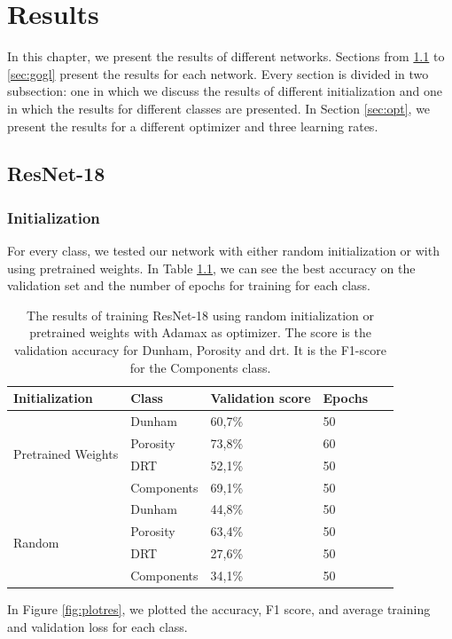\chapter{Results}\label{chp:results}

In this chapter, we present the results of different networks. Sections from \ref{sec:res} to \ref{sec:gogl} present the results for each network. Every section is divided in two subsection: one in which we discuss the results of different initialization and one in which the results for different classes are presented. In Section \ref{sec:opt}, we present the results for a different optimizer and three learning rates. 
\section{ResNet-18}\label{sec:res}
\subsection{Initialization}
For every class, we tested our network with either random initialization or with using pretrained weights. In Table \ref{tab:resinit}, we can see the best accuracy on the validation set and the number of epochs for training for each class.  

\begin{table}
\caption[Results according to initialization of ResNet-18]{\label{tab:resinit} The results of training ResNet-18 using random initialization or pretrained weights with Adamax as optimizer. The score is the validation accuracy for Dunham, Porosity and \gls{drt}. It is the F1-score for the Components class.}
\centering
\begin{tabular}[b]{| l | l | l | l | l |}
\hline
    Initialization & Class & Validation score & Epochs\ \\ \hline
    \multirow{4}{*}{Pretrained Weights} & Dunham &  60,7\%  & 50 \\ 
    & Porosity & 73,8\%  &  60 \\
    &DRT & 52,1\% &  50 \\
    &Components & 69,1\% &  50 \\ \hline
     \multirow{4}{*}{Random} & Dunham &  44,8\%  & 50 \\
    & Porosity & 63,4\% &  50 \\
    &DRT & 27,6\% & 50 \\
    &Components & 34,1\% &  50 \\ \hline
    
\end{tabular} 
\end{table}
In Figure \ref{fig:plotres}, we plotted the accuracy, F1 score, and average training and validation loss for each class. 


